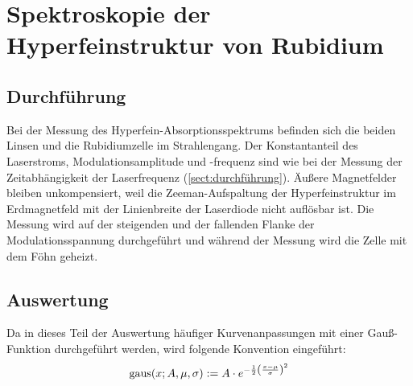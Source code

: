 \section{Spektroskopie der Hyperfeinstruktur von Rubidium}
\subsection{Durchführung}
Bei der Messung des Hyperfein-Absorptionsspektrums befinden sich die beiden Linsen und
die Rubidiumzelle im Strahlengang.
Der Konstantanteil des Laserstroms, Modulationsamplitude und -frequenz
sind wie bei der Messung der Zeitabhängigkeit der Laserfrequenz (\autoref{sect:durchführung}).
Äußere Magnetfelder bleiben unkompensiert, weil die Zeeman-Aufspaltung der Hyperfeinstruktur im Erdmagnetfeld
mit der Linienbreite der Laserdiode nicht auflösbar ist.
Die Messung wird auf der steigenden und der fallenden Flanke der Modulationsspannung durchgeführt und
während der Messung wird die Zelle mit dem Föhn geheizt.


\subsection{Auswertung}
Da in dieses Teil der Auswertung häufiger Kurvenanpassungen mit einer Gauß-Funktion durchgeführt werden, wird folgende Konvention eingeführt:
\begin{equation}
    \label{eq:convention:gauss}
    \operatorname{gaus}(x; A, \mu, \sigma) := A \cdot e^{-\frac{1}{2} \left( \frac{x-\mu}{\sigma} \right)^2}
\end{equation}
